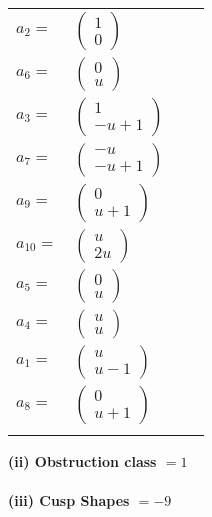 \documentclass[1p]{elsarticle_modified}
\theoremstyle{definition}
\begin{document}
\begin{tabular}{m{7pt} m{180pt} m{7pt} m{180pt} }
\flushright $a_{2}=$&$\begin{pmatrix}1\\0\end{pmatrix}$ \\
\flushright $a_{6}=$&$\begin{pmatrix}0\\u\end{pmatrix}$ \\
\flushright $a_{3}=$&$\begin{pmatrix}1\\- u+1\end{pmatrix}$ \\
\flushright $a_{7}=$&$\begin{pmatrix}- u\\- u+1\end{pmatrix}$ \\
\flushright $a_{9}=$&$\begin{pmatrix}0\\u+1\end{pmatrix}$ \\
\flushright $a_{10}=$&$\begin{pmatrix}u\\2 u\end{pmatrix}$ \\
\flushright $a_{5}=$&$\begin{pmatrix}0\\u\end{pmatrix}$ \\
\flushright $a_{4}=$&$\begin{pmatrix}u\\u\end{pmatrix}$ \\
\flushright $a_{1}=$&$\begin{pmatrix}u\\u-1\end{pmatrix}$ \\
\flushright $a_{8}=$&$\begin{pmatrix}0\\u+1\end{pmatrix}$\\&\end{tabular}
\flushleft \textbf{(ii) Obstruction class $= 1$}\\~\\
\flushleft \textbf{(iii) Cusp Shapes $= -9$}\\~\\
\end{document}
